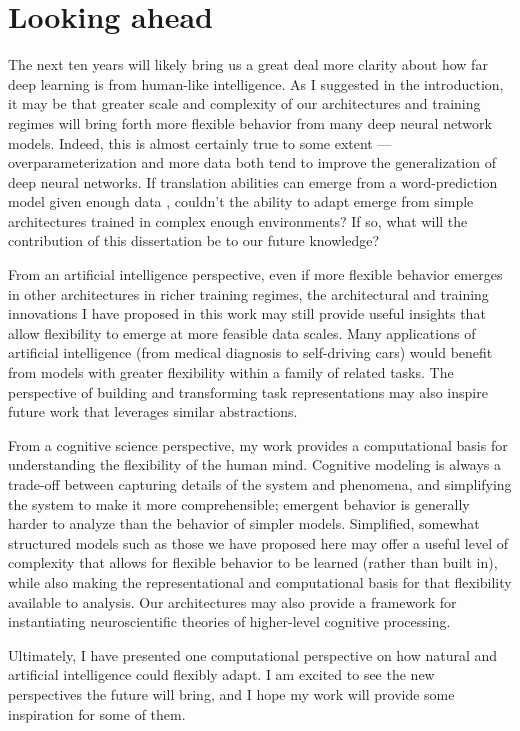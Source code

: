 \section{Looking ahead}

The next ten years will likely bring us a great deal more clarity about how far deep learning is from human-like intelligence. As I suggested in the introduction, it may be that greater scale and complexity of our architectures and training regimes will bring forth more flexible behavior from many deep neural network models. Indeed, this is almost certainly true to some extent --- overparameterization and more data both tend to improve the generalization of deep neural networks. If translation abilities can emerge from a word-prediction model given enough data \citep{Radford2019}, couldn't the ability to adapt emerge from simple architectures trained in complex enough environments? If so, what will the contribution of this dissertation be to our future knowledge? \par 

From an artificial intelligence perspective, even if more flexible behavior emerges in other architectures in richer training regimes, the architectural and training innovations I have proposed in this work may still provide useful insights that allow flexibility to emerge at more feasible data scales. Many applications of artificial intelligence (from medical diagnosis to self-driving cars) would benefit from models with greater flexibility within a family of related tasks. The perspective of building and transforming task representations may also inspire future work that leverages similar abstractions. \par 

From a cognitive science perspective, my work provides a computational basis for understanding the flexibility of the human mind. Cognitive modeling is always a trade-off between capturing details of the system and phenomena, and simplifying the system to make it more comprehensible; emergent behavior is generally harder to analyze than the behavior of simpler models. Simplified, somewhat structured models such as those we have proposed here may offer a useful level of complexity that allows for flexible behavior to be learned (rather than built in), while also making the representational and computational basis for that flexibility available to analysis. Our architectures may also provide a framework for instantiating neuroscientific theories of higher-level cognitive processing. \par 

Ultimately, I have presented one computational perspective on how natural and artificial intelligence could flexibly adapt. I am excited to see the new perspectives the future will bring, and I hope my work will provide some inspiration for some of them. 
